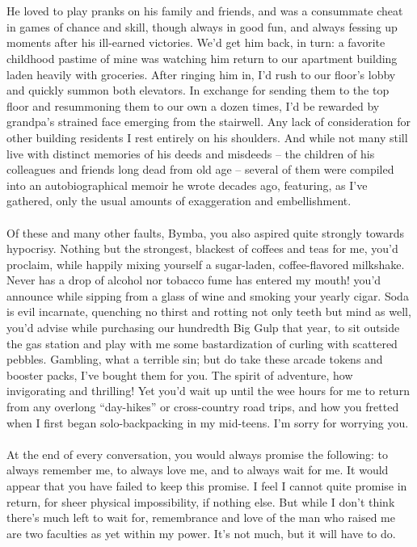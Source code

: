 \documentclass[twoside,twocolumn,openright]{article}
\begin{document}
\\\\
He loved to play pranks on his family and friends, and was a consummate cheat in games of chance and skill, though always in good fun, and always fessing up moments after his ill-earned victories. We’d get him back, in turn: a favorite childhood pastime of mine was watching him return to our apartment building laden heavily with groceries. After ringing him in, I’d rush to our floor’s lobby and quickly summon both elevators. In exchange for sending them to the top floor and resummoning them to our own a dozen times, I’d be rewarded by grandpa’s strained face emerging from the stairwell. Any lack of consideration for other building residents I rest entirely on his shoulders. And while not many still live with distinct memories of his deeds and misdeeds – the children of his colleagues and friends long dead from old age – several of them were compiled into an autobiographical memoir he wrote decades ago, featuring, as I’ve gathered, only the usual amounts of exaggeration and embellishment.
\\\\
Of these and many other faults, Bymba, you also aspired quite strongly towards hypocrisy. Nothing but the strongest, blackest of coffees and teas for me, you’d proclaim, while happily mixing yourself a sugar-laden, coffee-flavored milkshake. Never has a drop of alcohol nor tobacco fume has entered my mouth! you’d announce while sipping from a glass of wine and smoking your yearly cigar. Soda is evil incarnate, quenching no thirst and rotting not only teeth but mind as well, you’d advise while purchasing our hundredth Big Gulp that year, to sit outside the gas station and play with me some bastardization of curling with scattered pebbles. Gambling, what a terrible sin; but do take these arcade tokens and booster packs, I’ve bought them for you. The spirit of adventure, how invigorating and thrilling! Yet you’d wait up until the wee hours for me to return from any overlong “day-hikes” or cross-country road trips, and how you fretted when I first began solo-backpacking in my mid-teens. I’m sorry for worrying you.
\\\\
At the end of every conversation, you would always promise the following: to always remember me, to always love me, and to always wait for me. It would appear that you have failed to keep this promise. I feel I cannot quite promise in return, for sheer physical impossibility, if nothing else. But while I don’t think there’s much left to wait for, remembrance and love of the man who raised me are two faculties as yet within my power. It’s not much, but it will have to do.
\end{document}
